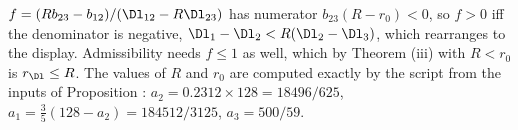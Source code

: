 $f = (Rb_{23} - b_{12})/(\Dl_{12} - R\Dl_{23})$ has numerator $b_{23}(R - r_{0}) < 0$, so $f > 0$ iff the denominator is negative, $\Dl_{1} - \Dl_{2} < R(\Dl_{2} - \Dl_{3})$, which rearranges to the display. Admissibility needs $f \le 1$ as well, which by Theorem (iii) with $R < r_{0}$ is $r_{\Dl} \le R$. The values of $R$ and $r_{0}$ are computed exactly by the script from the inputs of Proposition : $a_{2} = 0.2312 \times 128 = 18496/625$, $a_{1} = \tfrac35(128 - a_{2}) = 184512/3125$, $a_{3} = 500/59$.
